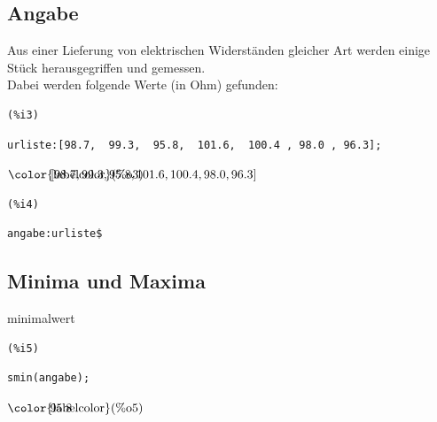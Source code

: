 \documentclass[12pt]{article}
\begin{document}
\subsection{Angabe}


Aus einer Lieferung von elektrischen Widerständen gleicher Art werden einige Stück herausgegriffen und gemessen.  \\
Dabei werden folgende Werte (in Ohm) gefunden:

\noindent
\begin{minipage}[t]{8ex}{\color{red}\bf
\begin{verbatim}
(%i3) 
\end{verbatim}}
\end{minipage}
\begin{minipage}[t]{\textwidth}{\color{blue}
\begin{verbatim}
urliste:[98.7,  99.3,  95.8,  101.6,  100.4 , 98.0 , 96.3];
\end{verbatim}}
\end{minipage}
\begin{math}\displaystyle
\parbox{8ex}{\color{labelcolor}(\%o3) }
[98.7,99.3,95.8,101.6,100.4,98.0,96.3]
\end{math}


\noindent
\begin{minipage}[t]{8ex}{\color{red}\bf
\begin{verbatim}
(%i4) 
\end{verbatim}}
\end{minipage}
\begin{minipage}[t]{\textwidth}{\color{blue}
\begin{verbatim}
angabe:urliste$
\end{verbatim}}
\end{minipage}


\subsection{Minima und Maxima}


minimalwert

\noindent
\begin{minipage}[t]{8ex}{\color{red}\bf
\begin{verbatim}
(%i5) 
\end{verbatim}}
\end{minipage}
\begin{minipage}[t]{\textwidth}{\color{blue}
\begin{verbatim}
smin(angabe);
\end{verbatim}}
\end{minipage}
\begin{math}\displaystyle
\parbox{8ex}{\color{labelcolor}(\%o5) }
95.8
\end{math}
\end{document}
